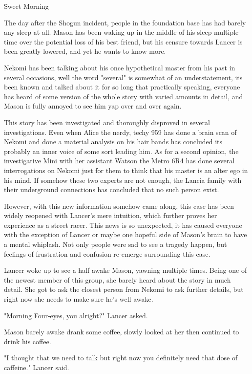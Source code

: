 \h {Sweet Morning}

The day after the Shogun incident, people in the foundation base has had barely any sleep at all. Mason has been waking up in the middle of his sleep multiple time over the potential loss of his best friend, but his censure towards Lancer is been greatly lowered, and yet he wants to know more. 

Nekomi has been talking about his once hypothetical master from his past in several occasions, well the word "several" is somewhat of an understatement, its been known and talked about it for so long that practically speaking, everyone has heard of some version of the whole story with varied amounts in detail, and Mason is fully annoyed to see him yap over and over again. 

This story has been investigated and thoroughly disproved in several investigations. Even when Alice the nerdy, techy 959 has done a brain scan of Nekomi and done a material analysis on his hair bands has concluded its probably an inner voice of some sort leading him. As for a second opinion, the investigative Mini with her assistant Watson the Metro 6R4 has done several interrogations on Nekomi just for them to think that his master is an alter ego in his mind. If somehow these two experts are not enough, the Lancia family with their underground connections has concluded that no such person exist. 

However, with this new information somehow came along, this case has been widely reopened with Lancer's mere intuition, which further proves her experience as a street racer. This news is so unexpected, it has caused everyone with the exception of Lancer or maybe one hopeful side of Mason's brain to have a mental whiplash. Not only people were sad to see a tragedy happen, but feelings of frustration and confusion re-emerge surrounding this case.

Lancer woke up to see a half awake Mason, yawning multiple times. Being one of the newest member of this group, she barely heard about the story in much detail. She got to ask the closest person from Nekomi to ask further details, but right now she needs to make sure he's well awake. 

"Morning Four-eyes, you alright?" Lancer asked.

Mason barely awake drank some coffee, slowly looked at her then continued to drink his coffee. 

"I thought that we need to talk but right now you definitely need that dose of caffeine." Lancer said. 


